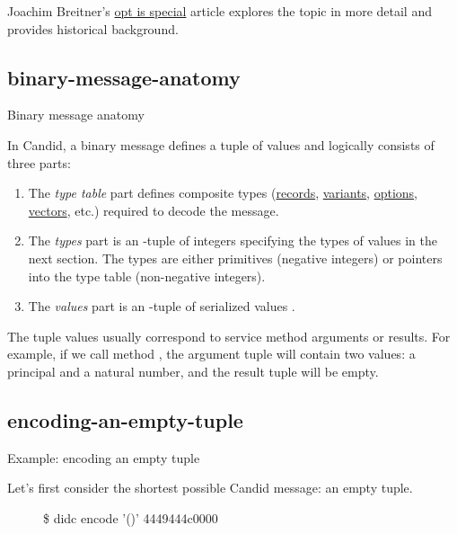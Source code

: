 \documentclass{article}
\begin{document}
Joachim Breitner's \href{https://www.joachim-breitner.de/blog/784-A_Candid_explainer__Opt_is_special}{opt is special} article explores the topic in more detail and provides historical background.

\subsection{binary-message-anatomy}{Binary message anatomy}

In Candid, a binary message defines a tuple of  values and logically consists of three parts:
\begin{enumerate}
    \item
    The \emph{type table} part defines composite types (\href{https://internetcomputer.org/docs/current/references/candid-ref#type-record--n--t--}{records}, \href{https://internetcomputer.org/docs/current/references/candid-ref#type-variant--n--t--}{variants}, \href{https://internetcomputer.org/docs/current/references/candid-ref#type-opt-t}{options}, \href{https://internetcomputer.org/docs/current/references/candid-ref#type-vec-t}{vectors}, etc.) required to decode the message.
    \item
    The \emph{types} part is an -tuple of integers specifying the types  of values in the next section.
    The types are either primitives (negative integers) or pointers into the type table (non-negative integers).
    \item
    The \emph{values} part is an -tuple of serialized values .
\end{enumerate}

The tuple values usually correspond to service method arguments or results.
For example, if we call method , the argument tuple will contain two values: a principal and a natural number, and the result tuple will be empty.

\subsection{encoding-an-empty-tuple}{Example: encoding an empty tuple}

Let's first consider the shortest possible Candid message: an empty tuple.

\begin{figure}
\begin{code}[shell]
\$ didc encode '()'
4449444c0000
\end{code}
\end{figure}
\end{document}
